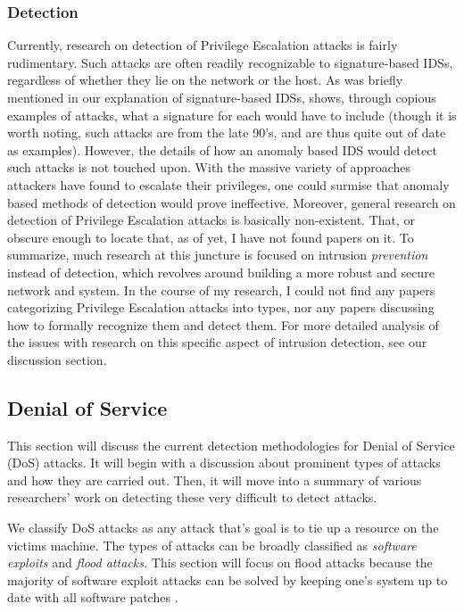 \documentclass{acm_proc_article-sp}
\begin{document}
     \subsubsection{Detection}
     	Currently, research on detection of Privilege Escalation attacks is fairly rudimentary. Such attacks are often readily recognizable to signature-based IDSs, regardless of whether they lie on the network or the host. As was briefly mentioned in our explanation of signature-based IDSs, \cite{Labs1999} shows, through copious examples of attacks, what a signature for each would have to include (though it is worth noting, such attacks are from the late 90's, and are thus quite out of date as examples). However, the details of how an anomaly based IDS would detect such attacks is not touched upon. With the massive variety of approaches attackers have found to escalate their privileges, one could surmise that anomaly based methods of detection would prove ineffective. Moreover, general research on detection of Privilege Escalation attacks is basically non-existent. That, or obscure enough to locate that, as of yet, I have not found papers on it. To summarize, much research at this juncture is focused on intrusion \emph{prevention} instead of detection, which revolves around building a more robust and secure network and system. In the course of my research, I could not find any papers categorizing Privilege Escalation attacks into types, nor any papers discussing how to formally recognize them and detect them. For more detailed analysis of the issues with research on this specific aspect of intrusion detection, see our discussion section.
     
    \subsection{Denial of Service}
    	This section will discuss the current detection methodologies for Denial of Service (DoS) attacks. It will begin with a discussion about prominent types of attacks and how they are carried out. Then, it will move into a summary of various researchers' work on detecting these very difficult to detect attacks. %
    	
    	We classify DoS attacks as any attack that's goal is to tie up a resource on the victims machine. The types of attacks can be broadly classified as \emph{software exploits} and \emph{flood attacks.} This section will focus on flood attacks because the majority of software exploit attacks can be solved by keeping one's system up to date with all software patches \cite{Hussain2003}. 
\end{document}
